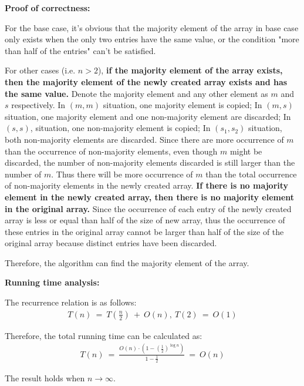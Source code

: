 \documentclass{article}
\begin{document}
{\textbf{Proof of correctness: }
\par For the base case, it's obvious that the majority element of the array in base case only exists when the only two entries have the same value, or the condition "more than half of the entries" can't be satisfied. 
\par For other cases (i.e. $n > 2$), \textbf{if the majority element of the array exists, then the majority element of the newly created array exists and has the same value.} Denote the majority element and any other element as $m$ and $s$ respectively. In $(m, m)$ situation, one majority element is copied; In $(m, s)$ situation, one majority element and one non-majority element are discarded; In $(s, s)$, situation, one non-majority element is copied; In $(s_1, s_2)$ situation, both non-majority elements are discarded. Since there are more occurrence of $m$ than the occurrence of non-majority elements, even though $m$ might be discarded, the number of non-majority elements discarded is still larger than the number of $m$. Thus there will be more occurrence of $m$ than the total occurrence of non-majority elements in the newly created array. \textbf{If there is no majority element in the newly created array, then there is no majority element in the original array.} Since the occurrence of each entry of the newly created array is less or equal than half of the size of new array, thus the occurrence of these entries in the original array cannot be larger than half of the size of the original array because distinct entries have been discarded.
\par Therefore, the algorithm can find the majority element of the array.\\

\par\textbf{Running time analysis: }
\par The recurrence relation is as follows:
\begin{align*}
	T(n)\ =\ T(\frac{n}{2})\ +\ O(n),\ T(2)\ =\ O(1)
\end{align*}
\par Therefore, the total running time can be calculated as: 
\begin{align*}
	T(n)\ =\ \frac{O(n)\cdot(1-(\frac{1}{2})^{\log n})}{1-\frac{1}{2}}\ =\ O(n)
\end{align*}
\par The result holds when $n \rightarrow \infty$.
}
\pagebreak
\end{document}
